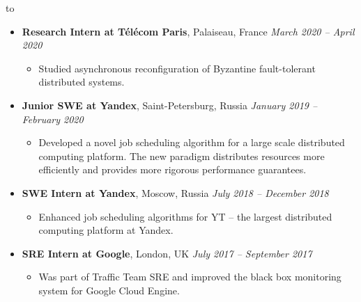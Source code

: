 \documentclass[10pt,a4paper]{extarticle}
\def\lnk#1#2{\href{#1}{\textcolor{darkblue}{\tbf{\textit{\underline{#2}}}}}}
\def\tbf{\textbf}
\def\lrg#1{\large\textbf{#1}\normalsize}
\def\headline#1{\bigskip\hbox to \hsize{\hrulefill\quad\lower.3em\hbox{\lrg{\textsc{#1}}}\quad\hrulefill}\bigskip}
\def\reslist{\vspace{-8pt}\begin{itemize}[label={},leftmargin=*]}
\def\endreslist{\end{itemize}\vspace{-5pt}}
\def\resRaw#1{
  \vspace{4pt}
  \item #1\normalsize
  \vspace{-4pt}
}
\def\resTime#1#2{
  \resRaw {
    \tbf{#1} \hspace*{\fill} \textit{#2}
  }
}
\def\resLocTime#1#2#3{
  \resRaw {
    \tbf{#1}, #2 \hspace*{\fill} \textit{#3}
  }
}
\def\beginres{\begin{itemize}[label=\raisebox{0.5ex}{\tiny$\bullet$}]}
\def\endres{\end{itemize}\vspace{-6pt}}
\def\subitem{\item}
\begin{document}
\headline{Work Experience}

\reslist
  \resLocTime{Research Intern at Télécom Paris} {Palaiseau, France} {March 2020 -- April 2020}
  \beginres
    \subitem
      Studied asynchronous reconfiguration of Byzantine fault-tolerant distributed systems.
  \endres

  \resLocTime{Junior SWE at Yandex} {Saint-Petersburg, Russia} {January 2019 -- February 2020}
  \beginres
    \subitem
      Developed a novel job scheduling algorithm for a large scale distributed computing platform. 
      The new paradigm distributes resources more efficiently and provides more rigorous performance guarantees.
  \endres

  \resLocTime{SWE Intern at Yandex} {Moscow, Russia} {July 2018 -- December 2018}
  \beginres
    \subitem Enhanced job scheduling algorithms for YT -- the largest distributed computing platform at Yandex.
  \endres

  \resLocTime{SRE Intern at Google} {London, UK} {July 2017 -- September 2017}
  \beginres
    \subitem Was part of Traffic Team SRE and improved the black box monitoring system for Google Cloud Engine.
  \endres
\endreslist




\end{document}
